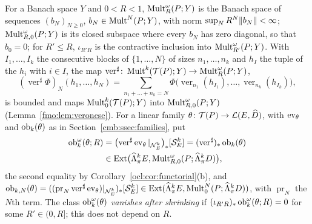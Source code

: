 For a Banach space $Y$ and $0<R<1$, $\operatorname{Mult}^\omega_R(P;Y)$ is the Banach space of sequences $(b_N)_{N\ge0}$,
$b_N\in\operatorname{Mult}^N(P;Y)$, with norm $\sup_NR^N\lVert b_N\rVert<\infty$; $\operatorname{Mult}^\omega_{R,0}(P;Y)$ is its closed subspace where every
$b_N$ has zero diagonal, so that $b_0=0$; for $R'\le R$, $\iota_{R'R}$ is the contractive inclusion into
$\operatorname{Mult}^\omega_{R'}(P;Y)$. With $I_1,\dots,I_k$ the consecutive blocks of $\{1,\dots,N\}$ of sizes $n_1,\dots,n_k$ and $h_I$
the tuple of the $h_i$ with $i\in I$, the map $\operatorname{ver}^\sharp\colon\operatorname{Mult}^k(\mathcal T(P);Y)\to\operatorname{Mult}^\omega_R(P;Y)$,
\[
 (\operatorname{ver}^\sharp\Phi)_N(h_1,\dots,h_N)=\sum_{n_1+\dots+n_k=N}
 \Phi\bigl(\operatorname{ver}_{n_1}(h_{I_1}),\dots,\operatorname{ver}_{n_k}(h_{I_k})\bigr),
\]
is bounded and maps $\operatorname{Mult}^k_0(\mathcal T(P);Y)$ into $\operatorname{Mult}^\omega_{R,0}(P;Y)$ (Lemma~\ref{fmo:lem:veronese}). For a linear
family $\theta\colon\mathcal T(P)\to\mathcal L(E,\widehat D)$, with $\operatorname{ev}_\theta$ and $\operatorname{ob}_k(\theta)$ as in
Section~\ref{cmb:ssec:families}, put
\begin{equation}\label{fam2:eq:class}
\begin{split}
 \operatorname{ob}^\omega_k(\theta;R)&=\bigl(\operatorname{ver}^\sharp\operatorname{ev}_\theta|_{\mathcal N^k_E}\bigr)_*[\mathcal S^k_E]
 =(\operatorname{ver}^\sharp)_*\operatorname{ob}_k(\theta)\\
 &\in\operatorname{Ext}\bigl(\widehat\Lambda^k_\pi E,\operatorname{Mult}^\omega_{R,0}(P;\widehat\Lambda^k_\pi D)\bigr),
\end{split}
\end{equation}
the second equality by Corollary~\ref{ocl:cor:functorial}(b), and
$\operatorname{ob}_{k,N}(\theta)=((\operatorname{pr}_N\operatorname{ver}^\sharp\operatorname{ev}_\theta)|_{\mathcal N^k_E})_*[\mathcal S^k_E]
\in\operatorname{Ext}(\widehat\Lambda^k_\pi E,\allowbreak\operatorname{Mult}^N_0(P;\widehat\Lambda^k_\pi D))$, with $\operatorname{pr}_N$ the $N$th term. The class
$\operatorname{ob}^\omega_k(\theta)$ \emph{vanishes after shrinking} if $(\iota_{R'R})_*\operatorname{ob}^\omega_k(\theta;R)=0$ for some
$R'\in(0,R]$; this does not depend on $R$.


